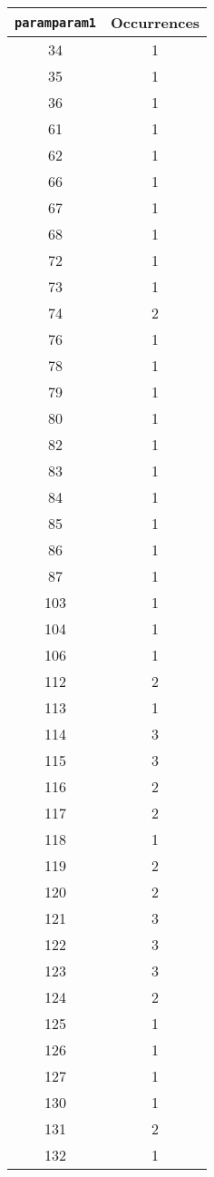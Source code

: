 \documentclass[letterpaper, 12pt]{article}
\begin{document}
\begin{longtable}{|c|c|}
\hline
\textbf{\texttt{paramparam1}} & \textbf{Occurrences} \\
\hline
34 & 1 \\
\hline
35 & 1 \\
\hline
36 & 1 \\
\hline
61 & 1 \\
\hline
62 & 1 \\
\hline
66 & 1 \\
\hline
67 & 1 \\
\hline
68 & 1 \\
\hline
72 & 1 \\
\hline
73 & 1 \\
\hline
74 & 2 \\
\hline
76 & 1 \\
\hline
78 & 1 \\
\hline
79 & 1 \\
\hline
80 & 1 \\
\hline
82 & 1 \\
\hline
83 & 1 \\
\hline
84 & 1 \\
\hline
85 & 1 \\
\hline
86 & 1 \\
\hline
87 & 1 \\
\hline
103 & 1 \\
\hline
104 & 1 \\
\hline
106 & 1 \\
\hline
112 & 2 \\
\hline
113 & 1 \\
\hline
114 & 3 \\
\hline
115 & 3 \\
\hline
116 & 2 \\
\hline
117 & 2 \\
\hline
118 & 1 \\
\hline
119 & 2 \\
\hline
120 & 2 \\
\hline
121 & 3 \\
\hline
122 & 3 \\
\hline
123 & 3 \\
\hline
124 & 2 \\
\hline
125 & 1 \\
\hline
126 & 1 \\
\hline
127 & 1 \\
\hline
130 & 1 \\
\hline
131 & 2 \\
\hline
132 & 1 \\

\end{longtable}
\end{document}
